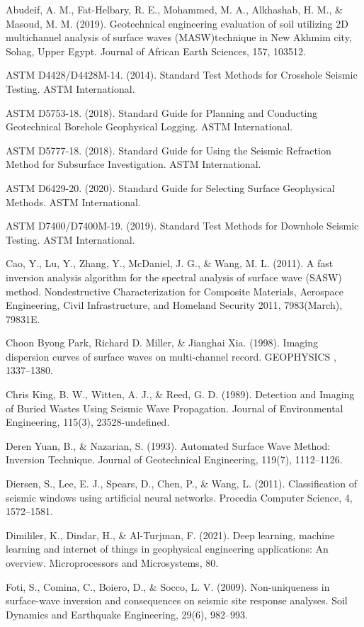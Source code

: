 Abudeif, A. M., Fat-Helbary, R. E., Mohammed, M. A., Alkhashab, H. M., \& Masoud, M. M. (2019). Geotechnical engineering evaluation of soil utilizing 2D multichannel analysis of surface waves (MASW)technique in New Akhmim city, Sohag, Upper Egypt. Journal of African Earth Sciences, 157, 103512. 

ASTM D4428/D4428M-14. (2014). Standard Test Methods for Crosshole Seismic Testing. ASTM International. 

ASTM D5753-18. (2018). Standard Guide for Planning and Conducting Geotechnical Borehole Geophysical Logging. ASTM International. 

ASTM D5777-18. (2018). Standard Guide for Using the Seismic Refraction Method for Subsurface Investigation. ASTM International. 

ASTM D6429-20. (2020). Standard Guide for Selecting Surface Geophysical Methods. ASTM International.

ASTM D7400/D7400M-19. (2019). Standard Test Methods for Downhole Seismic Testing. ASTM International. 

Cao, Y., Lu, Y., Zhang, Y., McDaniel, J. G., \& Wang, M. L. (2011). A fast inversion analysis algorithm for the spectral analysis of surface wave (SASW) method. Nondestructive Characterization for Composite Materials, Aerospace Engineering, Civil Infrastructure, and Homeland Security 2011, 7983(March), 79831E. 

Choon Byong Park, Richard D. Miller, \& Jianghai Xia. (1998). Imaging dispersion curves of surface waves on multi‐channel record. GEOPHYSICS , 1337–1380. 

Chris King, B. W., Witten, A. J., \& Reed, G. D. (1989). Detection and Imaging of Buried Wastes Using Seismic Wave Propagation. Journal of Environmental Engineering, 115(3), 23528-undefined. 

Deren Yuan, B., \& Nazarian, S. (1993). Automated Surface Wave Method: Inversion Technique. Journal of Geotechnical Engineering, 119(7), 1112–1126. 

Diersen, S., Lee, E. J., Spears, D., Chen, P., \& Wang, L. (2011). Classification of seismic windows using artificial neural networks. Procedia Computer Science, 4, 1572–1581. 

Dimililer, K., Dindar, H., \& Al-Turjman, F. (2021). Deep learning, machine learning and internet of things in geophysical engineering applications: An overview. Microprocessors and Microsystems, 80. 

Foti, S., Comina, C., Boiero, D., \& Socco, L. V. (2009). Non-uniqueness in surface-wave inversion and consequences on seismic site response analyses. Soil Dynamics and Earthquake Engineering, 29(6), 982–993. 

